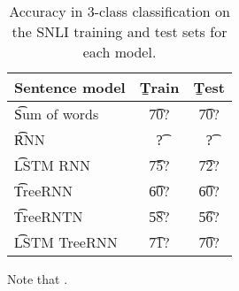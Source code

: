 \begin{table}
\begin{center}
\begin{tabular}{l@{\hskip \colspaceL}@{\hskip \colspaceL}c@{\hskip \colspaceL}c}
\hline
\textbf{Sentence model} & \b{Train}  & \b{Test}\\
\hline
\t{Sum of words}            & \t{70?} & \t{70?} \\
\t{RNN}            & \t{?} & \t{?} \\
\t{LSTM RNN}            & \t{75?} & \t{72?} \\
\t{TreeRNN}            & \t{60?} & \t{60?} \\
\t{TreeRNTN}            & \t{58?} & \t{56?} \\
\t{LSTM TreeRNN}            & \t{71?} & \t{70?} \\
\hline
\end{tabular}
\end{center}
\caption{
\label{tab:nnresults}
Accuracy in 3-class classification on the SNLI training and test sets for each model.
}
\end{table}

Note that .
